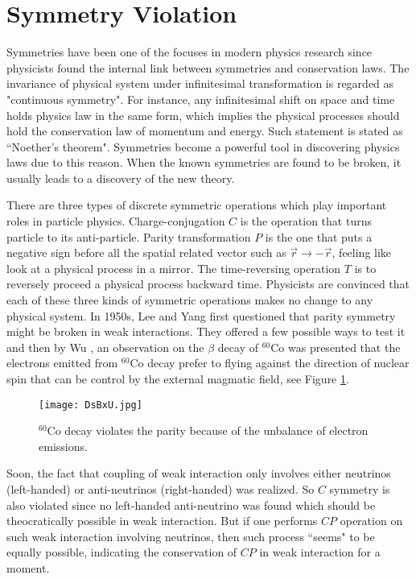 \section{Symmetry Violation}
Symmetries have been one of the focuses in modern physics research since physicists found the internal link between symmetries and conservation laws. The invariance of physical system under infinitesimal transformation is regarded as "continuous symmetry". For instance, any infinitesimal shift on space and time holds physics law in the same form, which implies the physical processes should hold the conservation law of momentum and energy. Such statement is stated as ``Noether’s theorem"\cite{noether}.  Symmetries become a powerful tool in discovering physics laws due to this reason. When the known symmetries are found to be broken, it usually leads to a discovery of the new theory.


There are three types of discrete symmetric operations which play important roles in particle physics. Charge-conjugation $\textit{C}$ is the operation that turns particle to its anti-particle. Parity transformation $\textit{P}$  is the one that puts a negative sign before all the spatial related vector such as $\overrightarrow{r} \to -\overrightarrow{r}$, feeling like look at a physical process in a mirror. The time-reversing operation $\textit{T}$ is to reversely proceed a physical process backward time.  Physicists are convinced that each of these three kinds of symmetric operations makes no change to any physical system. In 1950s, Lee and Yang \cite{PhysRev.104.254} first questioned that parity symmetry might be broken in weak interactions. They offered a few possible ways to test it and then by Wu \cite{Wu_exp}, an observation on the $\beta$ decay of $^{60}$Co was presented that the electrons emitted from  $^{60}$Co decay prefer to flying against the direction of nuclear spin that can be control by the external magmatic field, see Figure \ref{fig:Co60}.

\begin{figure}[htbp]
	\centering
	\texttt{[image: DsBxU.jpg]}
	\caption{$^{60}$Co decay violates the parity because of the unbalance of electron emissions.}
	\label{fig:Co60}
\end{figure}

Soon, the fact that coupling of weak interaction only involves either neutrinos (left-handed) or anti-neutrinos (right-handed) was realized. So $C$ symmetry is also violated since no left-handed anti-neutrino was found which should be theocratically possible in weak interaction. But if one performs $CP$ operation on such weak interaction involving neutrinos, then such process ``seems" to be equally possible, indicating the conservation of $CP$ in weak interaction for a moment. 

